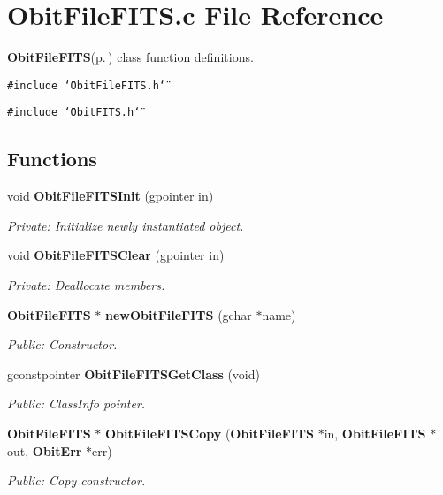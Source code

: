 \section{Obit\-File\-FITS.c File Reference}
\label{ObitFileFITS_8c}
{\bf Obit\-File\-FITS}{\rm (p.\,\pageref{structObitFileFITS})} class function definitions. 

{\tt \#include \char`\"{}Obit\-File\-FITS.h\char`\"{}}\par
{\tt \#include \char`\"{}Obit\-FITS.h\char`\"{}}\par
\subsection*{Functions}
\begin{CompactItemize}
\item 
void {\bf Obit\-File\-FITSInit} (gpointer in)
\begin{CompactList}\small\item\em Private: Initialize newly instantiated object. \item\end{CompactList}\item 
void {\bf Obit\-File\-FITSClear} (gpointer in)
\begin{CompactList}\small\item\em Private: Deallocate members. \item\end{CompactList}\item 
{\bf Obit\-File\-FITS} $\ast$ {\bf new\-Obit\-File\-FITS} (gchar $\ast$name)
\begin{CompactList}\small\item\em Public: Constructor. \item\end{CompactList}\item 
gconstpointer {\bf Obit\-File\-FITSGet\-Class} (void)
\begin{CompactList}\small\item\em Public: Class\-Info pointer. \item\end{CompactList}\item 
{\bf Obit\-File\-FITS} $\ast$ {\bf Obit\-File\-FITSCopy} ({\bf Obit\-File\-FITS} $\ast$in, {\bf Obit\-File\-FITS} $\ast$out, {\bf Obit\-Err} $\ast$err)
\begin{CompactList}\small\item\em Public: Copy constructor. \item\end{CompactList}\item 

\end{CompactItemize}
